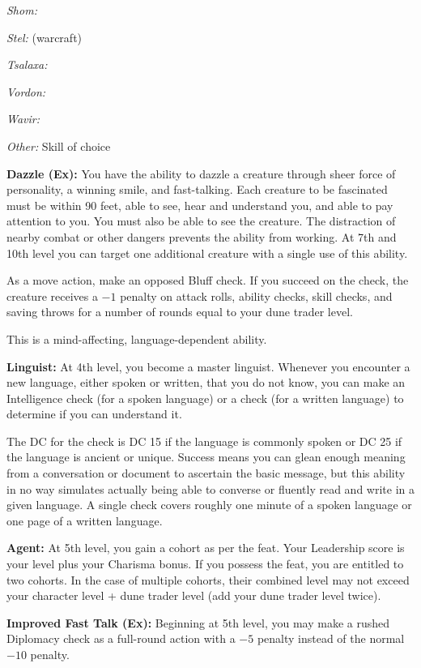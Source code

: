 \textit{Shom:} 

\textit{Stel:}  (warcraft)

\textit{Tsalaxa:} 

\textit{Vordon:} 

\textit{Wavir:} 

\textit{Other:} Skill of choice

\textbf{Dazzle (Ex):} You have the ability to dazzle a creature through sheer force of personality, a winning smile, and fast-talking. Each creature to be fascinated must be within 90 feet, able to see, hear and understand you, and able to pay attention to you. You must also be able to see the creature. The distraction of nearby combat or other dangers prevents the ability from working. At 7th and 10th level you can target one additional creature with a single use of this ability.

As a move action, make an opposed Bluff check. If you succeed on the check, the creature receives a $-1$ penalty on attack rolls, ability checks, skill checks, and saving throws for a number of rounds equal to your dune trader level.

This is a mind-affecting, language-dependent ability.

\textbf{Linguist:} At 4th level, you become a master linguist. Whenever you encounter a new language, either spoken or written, that you do not know, you can make an Intelligence check (for a spoken language) or a  check (for a written language) to determine if you can understand it.

The DC for the check is DC 15 if the language is commonly spoken or DC 25 if the language is ancient or unique. Success means you can glean enough meaning from a conversation or document to ascertain the basic message, but this ability in no way simulates actually being able to converse or fluently read and write in a given language. A single check covers roughly one minute of a spoken language or one page of a written language.

\textbf{Agent:} At 5th level, you gain a cohort as per the  feat. Your Leadership score is your level plus your Charisma bonus. If you possess the  feat, you are entitled to two cohorts. In the case of multiple cohorts, their combined level may not exceed your character level + dune trader level (add your dune trader level twice).

\textbf{Improved Fast Talk (Ex):} Beginning at 5th level, you may make a rushed Diplomacy check as a full-round action with a $-5$ penalty instead of the normal $-10$ penalty.

